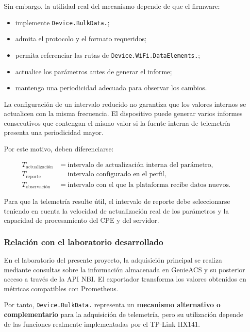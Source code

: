 Sin embargo, la utilidad real del mecanismo depende de que el firmware:

\begin{itemize}
    \item implemente \texttt{Device.BulkData.};
    \item admita el protocolo y el formato requeridos;
    \item permita referenciar las rutas de
    \texttt{Device.WiFi.DataElements.};
    \item actualice los parámetros antes de generar el informe;
    \item mantenga una periodicidad adecuada para observar los cambios.
\end{itemize}

La configuración de un intervalo reducido no garantiza que los valores
internos se actualicen con la misma frecuencia. El dispositivo puede
generar varios informes consecutivos que contengan el mismo valor si la
fuente interna de telemetría presenta una periodicidad mayor.

Por este motivo, deben diferenciarse:

\[
\begin{aligned}
    T_{\mathrm{actualización}}
    &=
    \text{intervalo de actualización interna del parámetro},\\
    T_{\mathrm{reporte}}
    &=
    \text{intervalo configurado en el perfil},\\
    T_{\mathrm{observación}}
    &=
    \text{intervalo con el que la plataforma recibe datos nuevos}.
\end{aligned}
\]

Para que la telemetría resulte útil, el intervalo de reporte debe
seleccionarse teniendo en cuenta la velocidad de actualización real de
los parámetros y la capacidad de procesamiento del CPE y del servidor.


\subsubsection*{Relación con el laboratorio desarrollado}

En el laboratorio del presente proyecto, la adquisición principal se
realiza mediante consultas sobre la información almacenada en GenieACS y
su posterior acceso a través de la API NBI. El exportador transforma los
valores obtenidos en métricas compatibles con Prometheus.

Por tanto, \texttt{Device.BulkData.} representa un
\textbf{mecanismo alternativo o complementario} para la adquisición de
telemetría, pero su utilización depende de las funciones realmente
implementadas por el TP-Link HX141.

